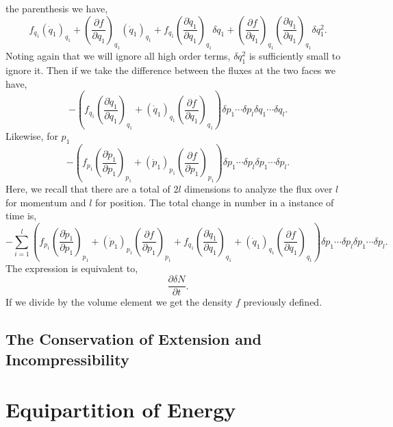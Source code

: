 the parenthesis we have,
\begin{equation*}
	f_{q_{1}}(\dot{q}_{1})_{q_{1}}
	+
	\left(\frac{\partial f}{\partial q_{1}}\right)_{q_{1}}(\dot{q}_{1})_{q_{1}}
	+
	f_{q_{1}}\left(\frac{\partial \dot{q}_{1}}{\partial q_{1}}\right)_{q_{1}}
	\delta q_{1}
	+
	\left(\frac{\partial f}{\partial q_{1}}\right)_{q_{1}}
	\left(\frac{\partial \dot{q}_{1}}{\partial q_{1}}\right)_{q_{1}}\delta
	q_{1}^{2}.
\end{equation*}
Noting again that we will ignore all high order terms, $\delta q_{1}^{2}$ is
sufficiently small to ignore it. Then if we take the difference between the
fluxes at the two faces we have,
\begin{equation*}
	-\left(f_{q_{1}}\left(\frac{\partial \dot{q}_{1}}
	{\partial q_{1}}\right)_{q_{1}} + (\dot{q}_{1})_{q_{1}}
	\left(\frac{\partial f}{\partial q_{1}}\right)_{q_{1}}\right)
	\delta p_1 \cdots \delta p_{l} \delta q_1 \cdots \delta q_{l}.
\end{equation*}
Likewise, for $p_{1}$
\begin{equation*}
	-\left(f_{p_{1}}\left(\frac{\partial \dot{p}_{1}}
	{\partial p_{1}}\right)_{p_{1}} + (\dot{p}_{1})_{p_{1}}
	\left(\frac{\partial f}{\partial p_{1}}\right)_{p_{1}}\right)
	\delta p_1 \cdots \delta p_{l} \delta p_1 \cdots \delta p_{l}.
\end{equation*}
Here, we recall that there are a total of $2l$ dimensions to analyze the flux
over $l$ for momentum and $l$ for position. The total change in number in a
instance of time is,
\begin{equation*}
	-\sum_{i=1}^{l}{\left(f_{p_{1}}\left(\frac{\partial \dot{p}_{1}} {\partial
	p_{1}}\right)_{p_{1}} + (\dot{p}_{1})_{p_{1}} \left(\frac{\partial
	f}{\partial p_{1}}\right)_{p_{1}} + f_{q_{1}}\left(\frac{\partial \dot{q}_{1}}
	{\partial q_{1}}\right)_{q_{1}} + (\dot{q}_{1})_{q_{1}}
	\left(\frac{\partial f}{\partial q_{1}}\right)_{q_{1}}\right)
	\delta p_1 \cdots \delta p_{l} \delta p_1 \cdots \delta p_{l}}.
\end{equation*}
The expression is equivalent to,
\begin{equation*}
	\frac{\partial\delta N}{\partial t}.
\end{equation*}
If we divide by the volume element we get the density $f$ previously defined.
\subsection{The Conservation of Extension and Incompressibility}

\section{Equipartition of Energy}%
\label{sec:eoe}
